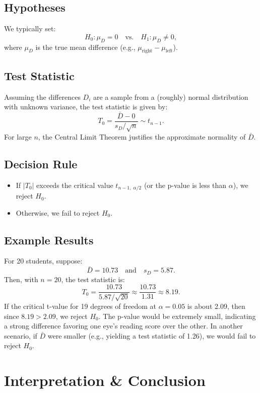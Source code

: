 \documentclass[10pt]{extarticle}
\begin{document}
\subsection{Hypotheses}
We typically set:
\[
H_0: \mu_D = 0 \quad \text{vs.} \quad H_1: \mu_D \neq 0,
\]
where $\mu_D$ is the true mean difference (e.g., $\mu_{\text{right}} - \mu_{\text{left}}$).

\subsection{Test Statistic}
Assuming the differences $D_i$ are a sample from a (roughly) normal distribution with unknown variance, the test statistic is given by:
\[
T_0 = \frac{\bar{D} - 0}{s_D / \sqrt{n}} \sim t_{n-1}.
\]
For large $n$, the Central Limit Theorem justifies the approximate normality of $\bar{D}$.

\subsection{Decision Rule}
\begin{itemize}
    \item If $|T_0|$ exceeds the critical value $t_{n-1,\;\alpha/2}$ (or the p-value is less than $\alpha$), we reject $H_0$.
    \item Otherwise, we fail to reject $H_0$.
\end{itemize}

\subsection{Example Results}
For 20 students, suppose:
\[
\bar{D} = 10.73 \quad \text{and} \quad s_D = 5.87.
\]
Then, with $n = 20$, the test statistic is:
\[
T_0 = \frac{10.73}{5.87/\sqrt{20}} \approx \frac{10.73}{1.31} \approx 8.19.
\]
If the critical t-value for 19 degrees of freedom at $\alpha = 0.05$ is about 2.09, then since $8.19 > 2.09$, we reject $H_0$. The p-value would be extremely small, indicating a strong difference favoring one eye’s reading score over the other. In another scenario, if $\bar{D}$ were smaller (e.g., yielding a test statistic of 1.26), we would fail to reject $H_0$.

\bigskip

\section{Interpretation \& Conclusion}
\end{document}
